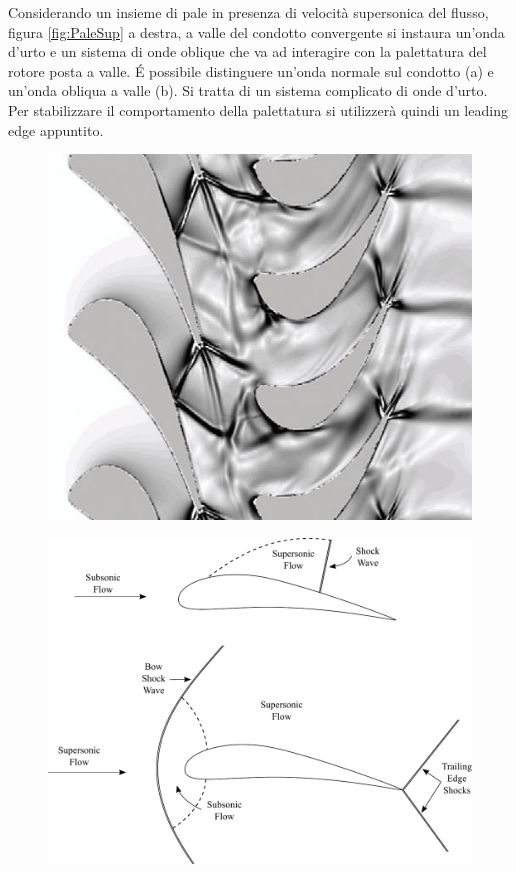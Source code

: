 Considerando un insieme di pale in presenza di velocità supersonica del flusso, figura \ref{fig:PaleSup} a destra, a valle del condotto convergente si instaura un'onda d'urto e un sistema di onde oblique che va ad interagire con la palettatura del rotore posta a valle. \'E possibile distinguere un'onda normale sul condotto (a) e un'onda obliqua a valle (b). Si tratta di un sistema complicato di onde d'urto. Per stabilizzare il comportamento della palettatura si utilizzerà quindi un leading edge appuntito.
\begin{figure}
\centering
\begin{minipage}{.5\textwidth}
  \centering
  \includegraphics[width=.95\linewidth]{fig/ou_schiera.png}
  \label{fig:ou_schiera}
\end{minipage}%
\begin{minipage}{.5\textwidth}
  \centering
  \includegraphics[width=.95\linewidth]{fig/SupSonic.pdf}
  \label{fig:SupSonic}
\end{minipage}
\end{figure}
